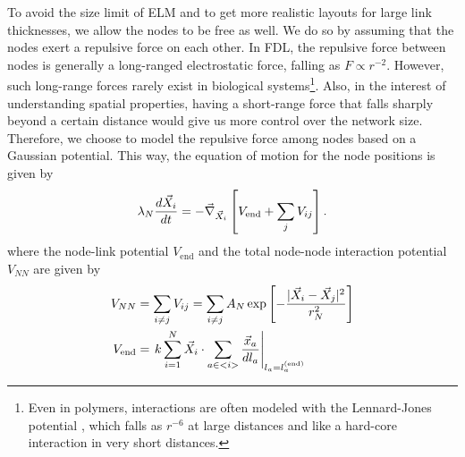 \documentclass[nofootinbib,preprint,floatfix,endfloats]{revtex4} %
\begin{document}
To avoid the size limit of ELM and to get more realistic layouts for large link thicknesses,
we allow the nodes to be free as well. 
We do so by assuming that the nodes exert a repulsive force on each other.  
In FDL, the repulsive force between nodes is generally a long-ranged electrostatic force, falling as $F \propto r^{-2}$. 
However, such long-range forces rarely exist in biological systems\footnote{Even in polymers, interactions are often modeled with the Lennard-Jones potential \cite{lennard1924determination}, which falls as $r^{-6}$ at large distances and like a hard-core interaction in very short distances. }.
Also, in the interest of understanding spatial properties, having a short-range %
force that falls sharply beyond a certain distance %
would give us more control over the network size. Therefore, we choose to model the repulsive force among nodes based on a Gaussian potential. %
This way, the equation of motion for the node positions is given by
\begin{equation}
    \lambda_N {d\vec{X}_i\over dt} = - \vec{\nabla}_{\vec{X}_i} \left[V_{\mathrm{end}} + \sum_j V_{ij} \right]. \label{eq:nodes}
\end{equation}
where the node-link potential $V_{\mathrm{end}}$ and the total node-node interaction potential $V_{NN}$ are given by 
\begin{align}
    V_{NN}&= \sum_{i\ne j} V_{ij} = \sum_{i\ne j} %
A_N \exp\left[- {|\vec{X}_i-\vec{X}_j|^2 \over r_N^2}\right]\label{eq:VIJ}\\
 V_{\mathrm{end}} & =\left. k\sum_{i=1}^N \vec{X}_i \cdot \sum_{a\in <i>}  {\vec{x}_a%
 \over dl_a}\right|_{l_a = l^{(\mathrm{end})}_a}
\end{align}
\end{document}
